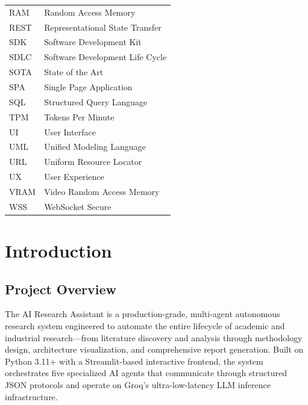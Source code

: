 \documentclass[a4paper,12pt,openany]{report}
\renewcommand{\headrulewidth}{0.4pt}
\renewcommand{\footrulewidth}{0.4pt}
\renewcommand{\headrulewidth}{0.4pt}
\renewcommand{\footrulewidth}{0.4pt}
\renewcommand{\headrulewidth}{0pt}%
\renewcommand{\footrulewidth}{0pt}%
\begin{document}
\begin{longtable}{p{3cm} p{10cm}}
RAM & Random Access Memory \\
REST & Representational State Transfer \\
SDK & Software Development Kit \\
SDLC & Software Development Life Cycle \\
SOTA & State of the Art \\
SPA & Single Page Application \\
SQL & Structured Query Language \\
TPM & Tokens Per Minute \\
UI & User Interface \\
UML & Unified Modeling Language \\
URL & Uniform Resource Locator \\
UX & User Experience \\
VRAM & Video Random Access Memory \\
WSS & WebSocket Secure \\
\end{longtable}


\newpage

\clearpage
\fancypagestyle{plain}{\fancyhf{}\fancyfoot[R]{\thepage}\renewcommand{\headrulewidth}{0pt}\renewcommand{\footrulewidth}{0.4pt}}
\pagestyle{fancy}

\chapter{Introduction}

\section{Project Overview}

The AI Research Assistant is a production-grade, multi-agent autonomous research system engineered to automate the entire lifecycle of academic and industrial research---from literature discovery and analysis through methodology design, architecture visualization, and comprehensive report generation. Built on Python 3.11+ with a Streamlit-based interactive frontend, the system orchestrates five specialized AI agents that communicate through structured JSON protocols and operate on Groq's ultra-low-latency LLM inference infrastructure.
\end{document}
